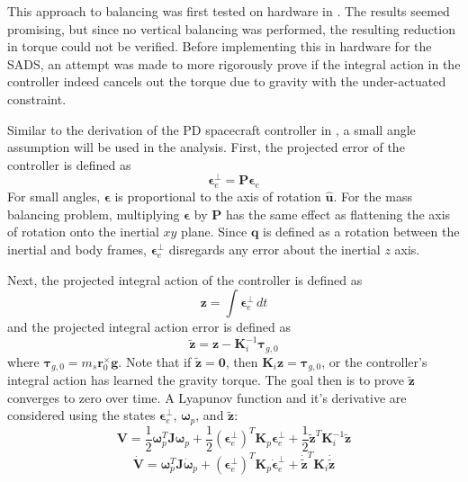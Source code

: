 This approach to balancing was first tested on hardware in \cite{choi_automatic_2016}. The results seemed promising, but since no vertical balancing was performed, the resulting reduction in torque could not be verified. Before implementing this in hardware for the SADS, an attempt was made to more rigorously prove if the integral action in the controller indeed cancels out the torque due to gravity with the under-actuated constraint.  

Similar to the derivation of the PD spacecraft controller in , a small angle assumption will be used in the analysis. First, the projected error of the controller is defined as 
\begin{equation}
    \bm{\epsilon}_e^\perp = \bm{P}\bm{\epsilon}_e
\end{equation}
For small angles, $\bm{\epsilon}$ is proportional to the axis of rotation $\hat{\bm{u}}$. For the mass balancing problem, multiplying $\bm{\epsilon}$ by $\bm{P}$ has the same effect as flattening the axis of rotation onto the inertial $xy$ plane. Since $\bm{q}$ is defined as a rotation between the inertial and body frames, $\bm{\epsilon}_e^\perp$ disregards any error about the inertial $z$ axis.

Next, the projected integral action of the controller is defined as 
\begin{equation}\label{equation:proj_int_action}
    \bm{z} = \int\bm{\epsilon}_e^\perp\,dt
\end{equation}
and the projected integral action error is defined as 
\begin{equation}\label{equation:proj_int_action_err}
    \tilde{\bm{z}} = \bm{z}-\bm{K}_i^{-1}\bm{\tau}_{g,0}
\end{equation}
where $\bm{\tau}_{g,0} = m_s\bm{r}_0^{\times}\bm{g}$. Note that if $\tilde{\bm{z}}=\bm{0}$, then $\bm{K}_i\bm{z} = \bm{\tau}_{g,0}$, or the controller's integral action has learned the gravity torque. The goal then is to prove $\tilde{\bm{z}}$ converges to zero over time. A Lyapunov function and it's derivative are considered using the states $\bm{\epsilon}_e^\perp$, $\bm{\omega}_p$, and $\tilde{\bm{z}}$:
\begin{equation}
    \bm{V}=\frac{1}{2}\bm{\omega}_p^T\bm{J}\bm{\omega}_p
    +\frac{1}{2}(\bm{\epsilon}_e^\perp)^T\bm{K}_p\bm{\epsilon}_e^\perp
    +\frac{1}{2}\tilde{\bm{z}}^T\bm{K}_i^{-1}\tilde{\bm{z}}
\end{equation}
\begin{equation}
    \dot{\bm{V}}=\bm{\omega}_p^T\bm{J}\dot{\bm{\omega}}_p
    +(\bm{\epsilon}_e^\perp)^T\bm{K}_p\dot{\bm{\epsilon}}_e^\perp
    +\dot{\tilde{\bm{z}}}^T\bm{K}_i\dot{\tilde{\bm{z}}}
\end{equation}

